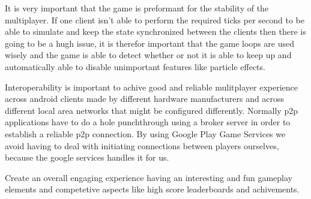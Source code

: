	It is very important that the game is preformant for the stability of the multiplayer. If one client isn't able to perform the required ticks per second to be able to simulate
	and keep the state synchronized between the clients then there is going to be a hugh issue, it is therefor important that the game loops are used wisely and the game is able to detect 
	whether or not it is able to keep up and automatically able to disable unimportant features like particle effects.
	
	Interoperability is important to achive good and reliable mulitplayer experience across android clients made by
	different hardware manufacturers and across different local area networks that might be configured differently. Normally p2p applications
	have to do a hole punchthrough using a broker server in order to establish a reliable p2p connection. By using Google Play Game Services we avoid having to deal
	with initiating connections between players ourselves, because the google services handles it for us. 

	Create an overall engaging experience having an interesting and fun gameplay elements and competetive aspects
	like high score leaderboards and achivements.
